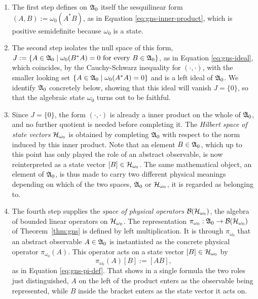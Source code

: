  	\begin{enumerate}
 		\item The first step defines on $\mathfrak{A}_0$ itself the sesquilinear form $(A,B) := \omega_0(A^*B)$, as in Equation \eqref{eq:gns-inner-product}, which is positive semidefinite because $\omega_0$ is a state.
 		
 		\item The second step isolates the null space of this form, $J := \{A\in\mathfrak{A}_0 \mid \omega_0(B^*A)=0 \text{ for every } B\in\mathfrak{A}_0\}$, as in Equation \eqref{eq:gns-ideal}, which coincides, by the Cauchy-Schwarz inequality for $(\cdot,\cdot)$, with the smaller looking set $\{A\in\mathfrak{A}_0 \mid \omega_0(A^*A)=0\}$ and is a left ideal of $\mathfrak{A}_0$. We identify $\mathfrak{A}_0$ concretely below, showing that this ideal will vanish $J=\{0\}$, so that the algebraic state $\omega_0$ turns out to be faithful.
 		
 		\item Since $J=\{0\}$, the form $(\cdot,\cdot)$ is already a inner product on the whole of $\mathfrak{A}_0$, and no further quotient is needed before completing it. The \emph{Hilbert space of state vectors} $\H_{\omega_0}$ is obtained by completing $\mathfrak{A}_0$ with respect to the norm induced by this inner product. Note that an element $B \in \mathfrak{A}_0$, which up to this point has only played the role of an abstract observable, is now reinterpreted as a state vector $[B] \in \H_{\omega_0}$. The same mathematical object, an element of $\mathfrak{A}_0$, is thus made to carry two different physical meanings depending on which of the two spaces, $\mathfrak{A}_0$ or $\H_{\omega_0}$, it is regarded as belonging to.
 		
 		\item The fourth step supplies the \emph{space of physical operators} $\mathcal{B}(\H_{\omega_0})$, the algebra of bounded linear operators on $\H_{\omega_0}$. The representation $\pi_{\omega_0} : \A_0 \to \mathcal{B}(\H_{\omega_0})$ of Theorem~\ref{thm:gns} is defined by left multiplication. It is through $\pi_{\omega_0}$ that an abstract observable $A \in \mathfrak{A}_0$ is instantiated as the concrete physical operator $\pi_{\omega_0}(A)$. This operator acts on a state vector $[B] \in \H_{\omega_0}$ by
 		\begin{equation}
 			\pi_{\omega_0}(A)[B]:=[AB],
 		\end{equation}
 		as in Equation \eqref{eq:gns-pi-def}. That shows in a single formula the two roles just distinguished, $A$ on the left of the product enters as the observable being represented, while $B$ inside the bracket enters as the state vector it acts on.
 		

\end{enumerate}
